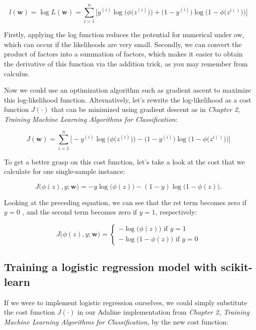 \documentclass{report}
\begin{document}
\[
l(\mathbf{w}) = \log L(\mathbf{w}) = \sum_{i=1}^{n} \Bigg[ y^{(i)} \log \bigg(\phi \big( z^{(i)} \big) \bigg) + \bigg(1 - y^{(i)} \bigg) \log \bigg( 1 - \phi \big( z^{i()} \big) \bigg)  \Bigg]
\]

Firstly, applying the log function reduces the potential for numerical under ow, which can occur if the likelihoods are very small. Secondly, we can convert the product of factors into a summation of factors, which makes it easier to obtain the derivative of this function via the addition trick, as you may remember
from calculus.

Now we could use an optimization algorithm such as gradient ascent to maximize this log-likelihood function. Alternatively, let's rewrite the log-likelihood as a cost function $J(\cdot)$ that can be minimized using gradient descent as in \textit{Chapter 2, Training Machine Learning Algorithms for Classification}:

\[
J(\mathbf{w}) = \sum_{i=1}^{n} \Bigg[- y^{(i)} \log \bigg(\phi \big( z^{(i)} \big) \bigg) - \bigg(1 - y^{(i)} \bigg) \log \bigg( 1 - \phi \big( z^{i()} \big) \bigg)  \Bigg]
\]

To get a better grasp on this cost function, let's take a look at the cost that we
calculate for one single-sample instance:

\[
J\big( \phi(z), y; \mathbf{w}   \big) = -y \log \big( \phi(z) \big) - (1-y) \log \big(1 - \phi(z) \big).
\]

Looking at the preceding equation, we can see that the  rst term becomes zero if
$y = 0$ , and the second term becomes zero if $y = 1$, respectively:


\[ 
J \big( \phi(z), y; \mathbf{w} \big)= \begin{cases} 
      - \log \big( \phi(z) \big) \text{ if } y=1\\
      - \log \big( 1 - \phi(z) \big)  \text{ if }  y=0
   \end{cases}
\]

\subsection{Training a logistic regression model with scikit-learn}

If we were to implement logistic regression ourselves, we could simply substitute the cost function $J(\cdot)$ in our Adaline implementation from \textit{Chapter 2, Training Machine Learning Algorithms for Classification}, by the new cost function:
\end{document}
